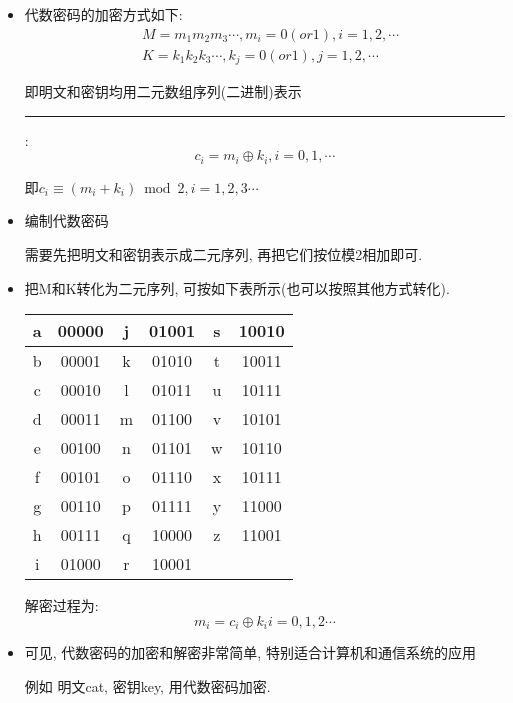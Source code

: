 \documentclass[UTF8]{ctexart}
\newcommand\hl{\bgroup\markoverwith
  {\textcolor{yellow}{\rule[-.5ex]{2pt}{2.5ex}}}\ULon}
\begin{document}
    \begin{itemize}
        \item 代数密码的加密方式如下:
        $$
        \begin{aligned}
            &M=m_1m_2m_3\cdots, m_i=0(or 1), i=1,2,\cdots\\
            &K=k_1k_2k_3\cdots, k_j=0(or 1), j=1,2,\cdots
        \end{aligned}
        $$

        即明文和密钥均用二元数组序列(二进制)表示

        \hl{加密过程如下}:
        $$c_i=m_i\oplus k_i, i=0, 1, \cdots$$

        即$c_i\equiv (m_i+k_i) \bmod 2, i=1,2,3 \cdots$

        \item 编制代数密码

        需要先把明文和密钥表示成二元序列, 再把它们按位模2相加即可.

        \item 把M和K转化为二元序列, 可按如下表所示(也可以按照其他方式转化).

        \begin{tabular}{|c|c||c|c||c|c|}
            \hline
            a &00000 &j &01001 &s &10010\\
            \hline
            b &00001 &k &01010 &t &10011\\
            \hline
            c &00010 &l &01011 &u &10111\\
            \hline
            d &00011 &m &01100 &v &10101\\
            \hline
            e &00100 &n &01101 &w &10110\\
            \hline
            f &00101 &o &01110 &x &10111\\
            \hline
            g &00110 &p &01111 &y &11000\\
            \hline
            h &00111 &q &10000 &z &11001\\
            \hline
            i &01000 &r &10001 & & \\
            \hline
        \end{tabular}

        解密过程为:
        $$m_i = c_i\oplus k_i i=0, 1, 2\cdots$$

        \item 可见, 代数密码的加密和解密非常简单, 特别适合计算机和通信系统的应用

        例如 明文cat, 密钥key, 用代数密码加密.


\end{itemize}
\end{document}
